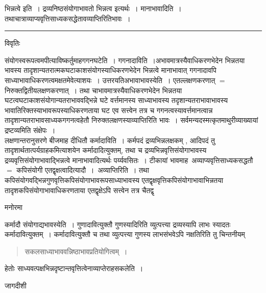 \documentclass[10pt, openany]{book}
\begin{document}
{{भिन्नत्वे इति~। द्रव्यनिष्ठसंयोगाभावतो भिन्नत्व इत्यर्थः~। मानाभावादिति~। तथाचात्राव्याप्यवृत्तिसाध्यकसद्धेतावव्याप्तिरितिभावः~।}\\
\hrule
\begin{center}     विवृतिः \end{center}
संयोगस्वरूपत्वमपीत्याविष्कर्तुमाह\textendash गगनघटेति~। गगनादाविति~।अभावमात्रस्यैवाधिकरणभेदेन भिन्नतया भावस्य तादृशान्यतरात्मकघटाकाशसंयोगस्याधिकरणभेदेन भिन्नत्वे मानाभावात् गगनादावपि साध्याभावाधिकरणत्वमक्षतमेवेत्याशयः~। उत्तरयति\textendash अभावाभावस्येति~। एतल्लक्षणकरणात् $=$ निरुक्तद्वितीयलक्षणकरणात्~। तथा चाभावमात्रस्यैवाधिकरणभेदेन भिन्नतया घटत्वघटाकाशसंयोगान्यतराभाववद्भिन्ने घटे वर्त्तमानस्य साध्याभावस्य तदृशान्यतराभावाभावस्य भावातिरिक्तस्याभावरूपस्याधिकरणताया घट एव सत्त्वेन तत्र च गगनत्वस्यावर्त्तमानत्वान्न तादृशान्यतराभावसाध्यकगगनत्वहेतौ
निरुक्तलक्षणस्याव्याप्तिरिति भावः~। सर्वमन्यदस्मत्कृतमाथुरीव्याख्यायां द्रष्टव्यमिति संक्षेपः~।\\

लक्षणान्तरानुसरणे बीजमाह दीधितौ कर्मादाविति~। कर्मपदं द्रव्यभिन्नलक्षकम् , आदिपदं तु तादृशार्थतात्पर्यग्राहकमित्याशयेन कर्मादादित्युक्तम्, तथा च द्रव्यभिन्नवृत्तिसंयोगाभावस्य द्रव्यवृत्तिसंयोगाभावाद्भिन्नत्वे मानाभावादित्यर्थः पर्य्यवसितः~। टीकायां भावमाह~अव्याप्यवृत्तिसाध्यकसद्धतौ $=$ 
कपिसंयोगी एतद्वृक्षत्वादित्यादौ~।~{\la अव्याप्तिरिति~।} तथा कपिसंयोगवद्भिन्नगुणवृत्तिकपिसंयोगाभावरूपसाध्याभावस्य एतद्वृक्षवृत्तिकपिसंयोगाभावाभिन्नतया तादृशकपिसंयोगाभावाधिकरणताया एतद्वृक्षेऽपि सत्त्वेन तत्र चैतद्वृ
\begin{center}   मनोरमा  \end{center}

कर्मादौ संयोगाद्यभावस्येति~। गुणादावित्युक्तौ गुणस्यादिरिति {\qt व्युत्पत्त्या }द्रव्यस्यापि लाभः स्यादतः कर्मादावित्युक्तम्~। कर्मादावित्युक्तौ च तथा व्युत्पत्त्या
गुणस्य लाभसंभवेऽपि नक्षतिरिति तु चिन्तनीयम्
\newpage
\begin{quote}
\vpc
सकलसाध्याभाववन्निष्ठाभावप्रतियोगित्वम्~।   
\end{quote}

{\la
हेतोः साध्यवत्पक्षभिन्नदृष्टान्तवृत्तित्वेनाव्याप्तेराह\textendash सकलेति~।}
\begin{center} जागदीशी \end{center}

}
\end{document}
